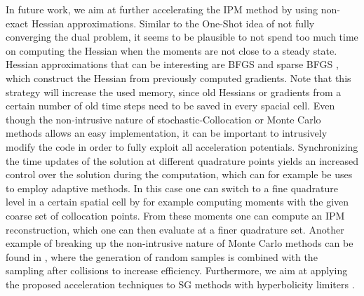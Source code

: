 In future work, we aim at further accelerating the IPM method by using non-exact Hessian approximations. Similar to the One-Shot idea of not fully converging the dual problem, it seems to be plausible to not spend too much time on computing the Hessian when the moments are not close to a steady state. Hessian approximations that can be interesting are BFGS and sparse BFGS \cite[Chapter~6.1]{nocedal2006numerical}, which construct the Hessian from previously computed gradients. Note that this strategy will increase the used memory, since old Hessians or gradients from a certain number of old time steps need to be saved in every spacial cell.
Even though the non-intrusive nature of stochastic-Collocation or Monte Carlo methods allows an easy implementation, it can be important to intrusively modify the code in order to fully exploit all acceleration potentials. Synchronizing the time updates of the solution at different quadrature points yields an increased control over the solution during the computation, which can for example be uses to employ adaptive methods. In this case one can switch to a fine quadrature level in a certain spatial cell by for example computing moments with the given coarse set of collocation points. From these moments one can compute an IPM reconstruction, which one can then evaluate at a finer quadrature set. Another example of breaking up the non-intrusive nature of Monte Carlo methods can be found in \cite{poette2019gpc}, where the generation of random samples is combined with the sampling after collisions to increase efficiency. Furthermore, we aim at applying the proposed acceleration techniques to SG methods with hyperbolicity limiters \cite{wu2017stochastic,schlachter2018hyperbolicity}.